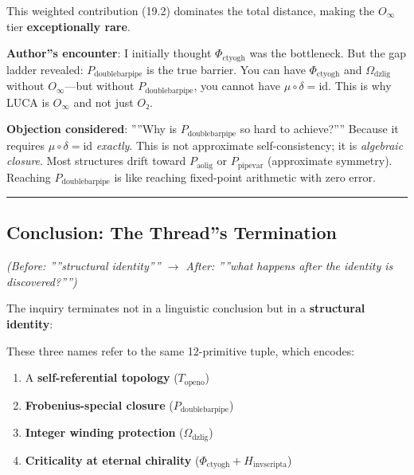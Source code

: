 \documentclass[12pt,a4paper]{article}
\begin{document}
This weighted contribution (19.2) dominates the total distance, making the $O_{\infty}$ tier \textbf{exceptionally rare}.

\textbf{Author''s encounter}: I initially thought $\Phi_{\text{ctyogh}}$ was the bottleneck. But the gap ladder revealed: $P_{\text{doublebarpipe}}$ is the true barrier. You can have $\Phi_{\text{ctyogh}}$ and $\Omega_{\text{dzlig}}$ without $O_{\infty}$---but without $P_{\text{doublebarpipe}}$, you cannot have $\mu \circ \delta = \text{id}$. This is why LUCA is $O_{\infty}$ and not just $O₂$.

\textbf{Objection considered}: ''''Why is $P_{\text{doublebarpipe}}$ so hard to achieve?'''' Because it requires $\mu \circ \delta = \text{id}$ \emph{exactly}. This is not approximate self-consistency; it is \emph{algebraic closure}. Most structures drift toward $P_{\text{aolig}}$ or $P_{\text{pipevar}}$ (approximate symmetry). Reaching $P_{\text{doublebarpipe}}$ is like reaching fixed-point arithmetic with zero error.

\begin{center}
\rule{0.5\textwidth}{0.4pt}
\end{center}

\subsection{Conclusion: The Thread''s Termination}

\emph{(Before: ''''structural identity'''' $\rightarrow$ After: ''''what happens after the identity is discovered?'''')}

The inquiry terminates not in a linguistic conclusion but in a \textbf{structural identity}:

\begin{quote}
\end{quote}

These three names refer to the same 12-primitive tuple, which encodes:

\begin{enumerate}
    \item A \textbf{self-referential topology} ($T_{\text{openo}}$)
    \item \textbf{Frobenius-special closure} ($P_{\text{doublebarpipe}}$)
    \item \textbf{Integer winding protection} ($\Omega_{\text{dzlig}}$)
    \item \textbf{Criticality at eternal chirality} ($\Phi_{\text{ctyogh}} + H_{\text{invscripta}}$)
\end{enumerate}
\end{document}

